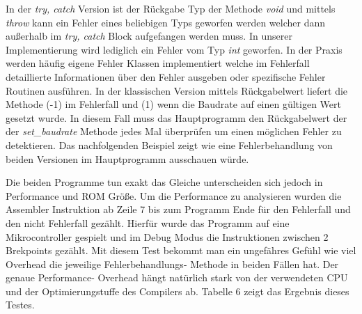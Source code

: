 \documentclass[MES,Master,ngerman]{twbook}%
\begin{document}
 In der \textit{try, catch} Version ist der Rückgabe Typ der Methode \textit{void} und mittels \textit{throw} kann ein Fehler eines beliebigen Typs geworfen werden welcher dann außerhalb im \textit{try, catch} Block aufgefangen werden muss. In unserer Implementierung wird lediglich ein Fehler vom Typ \textit{int} geworfen. In der Praxis werden häufig eigene Fehler Klassen implementiert welche im Fehlerfall detaillierte Informationen über den Fehler ausgeben oder spezifische Fehler Routinen ausführen. In der klassischen Version mittels Rückgabelwert liefert die Methode (-1) im Fehlerfall und (1) wenn die Baudrate auf einen gültigen Wert gesetzt wurde. In diesem Fall muss das Hauptprogramm den Rückgabelwert der der \textit{set\_baudrate} Methode jedes Mal überprüfen um einen möglichen Fehler zu detektieren. Das nachfolgenden Beispiel zeigt wie eine Fehlerbehandlung von beiden Versionen im Hauptprogramm ausschauen würde. \newpage
 
 \begin{figure}[!htb]
 	\begin{subfigure}[b]{0.5\textwidth}
 		
 		\label{fig:40}
 	\end{subfigure}
 	\begin{subfigure}[b]{0.5\textwidth}
 		
 		\label{fig:41}
 	\end{subfigure}
 \end{figure}

Die beiden Programme tun exakt das Gleiche unterscheiden sich jedoch in Performance und ROM Größe. Um die Performance zu analysieren wurden die Assembler Instruktion ab Zeile 7 bis zum Programm Ende für den Fehlerfall und den nicht Fehlerfall gezählt. Hierfür wurde das Programm auf eine Mikrocontroller gespielt und im Debug Modus die Instruktionen zwischen 2 Brekpoints gezählt. Mit diesem Test bekommt man ein ungefähres Gefühl wie viel Overhead die jeweilige Fehlerbehandlungs- Methode in beiden Fällen hat. Der genaue Performance- Overhead hängt natürlich stark von der verwendeten CPU und der Optimierungstuffe des Compilers ab. Tabelle 6 zeigt das Ergebnis dieses Testes.
\end{document}
